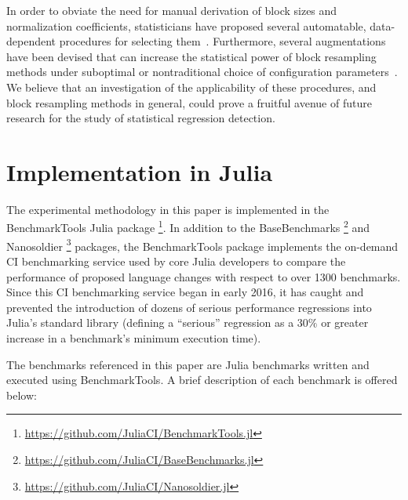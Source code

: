 \documentclass[conference]{IEEEtran}
\begin{document}
In order to obviate the need for manual derivation of block sizes and normalization
coefficients, statisticians have proposed several automatable, data-dependent procedures for
selecting them~\cite{Politis2004,Bickel2008}. Furthermore, several augmentations have been
devised that can increase the statistical power of block resampling methods under suboptimal
or nontraditional choice of configuration parameters~\cite{Berg2010,Shao2013}. We believe
that an investigation of the applicability of these procedures, and block resampling methods
in general, could prove a fruitful avenue of future research for the study of statistical
regression detection.

\label{sec:implementation}
\section{Implementation in Julia}

The experimental methodology in this paper is implemented in the BenchmarkTools Julia
package \footnote{\url{https://github.com/JuliaCI/BenchmarkTools.jl}}. In addition to the
BaseBenchmarks \footnote{\url{https://github.com/JuliaCI/BaseBenchmarks.jl}} and Nanosoldier
\footnote{\url{https://github.com/JuliaCI/Nanosoldier.jl}} packages, the BenchmarkTools
package implements the on-demand CI benchmarking service used by core Julia developers to
compare the performance of proposed language changes with respect to over 1300 benchmarks.
Since this CI benchmarking service began in early 2016, it has caught and prevented the
introduction of dozens of serious performance regressions into Julia's standard library
(defining a ``serious'' regression as a $30\%$ or greater increase in a benchmark's
minimum execution time).

The benchmarks referenced in this paper are Julia benchmarks written and executed using
BenchmarkTools. A brief description of each benchmark is offered below:
\end{document}
